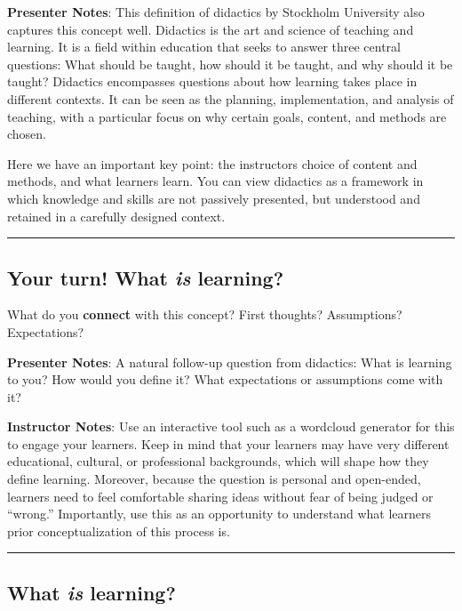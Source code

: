\documentclass[
  letterpaper,
  DIV=11,
  numbers=noendperiod]{scrartcl}
\begin{document}
\textbf{Presenter Notes}: This definition of didactics by Stockholm
University also captures this concept well. Didactics is the art and
science of teaching and learning. It is a field within education that
seeks to answer three central questions: What should be taught, how
should it be taught, and why should it be taught? Didactics encompasses
questions about how learning takes place in different contexts. It can
be seen as the planning, implementation, and analysis of teaching, with
a particular focus on why certain goals, content, and methods are
chosen.

Here we have an important key point: the instructors choice of content
and methods, and what learners learn. You can view didactics as a
framework in which knowledge and skills are not passively presented, but
understood and retained in a carefully designed context.

\begin{center}\rule{0.5\linewidth}{0.5pt}\end{center}

\subsection{\texorpdfstring{Your turn! What \emph{is}
learning?}{Your turn! What is learning?}}\label{your-turn-what-is-learning}

What do you \textbf{connect} with this concept? First thoughts?
Assumptions? Expectations?

\textbf{Presenter Notes}: A natural follow-up question from didactics:
What is learning to you? How would you define it? What expectations or
assumptions come with it?

\textbf{Instructor Notes}: Use an interactive tool such as a wordcloud
generator for this to engage your learners. Keep in mind that your
learners may have very different educational, cultural, or professional
backgrounds, which will shape how they define learning. Moreover,
because the question is personal and open-ended, learners need to feel
comfortable sharing ideas without fear of being judged or ``wrong.''
Importantly, use this as an opportunity to understand what learners
prior conceptualization of this process is.

\begin{center}\rule{0.5\linewidth}{0.5pt}\end{center}

\subsection{\texorpdfstring{What \emph{is}
learning?}{What is learning?}}\label{what-is-learning}
\end{document}
